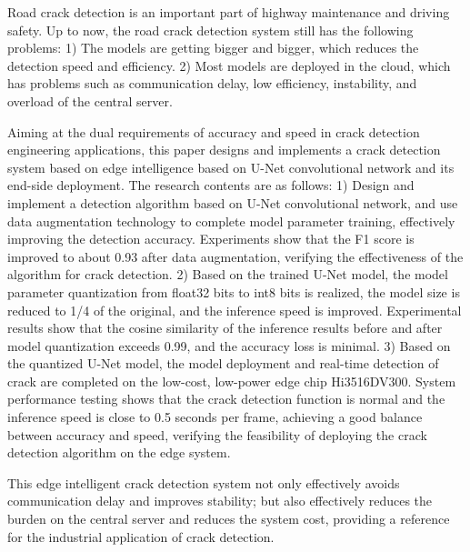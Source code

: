 
\begin{englishabstract}

Road crack detection is an important part of highway maintenance and driving safety.
Up to now, the road crack detection system still has the following problems: 
1) The models are getting bigger and bigger, which reduces the detection speed and efficiency.
2) Most models are deployed in the cloud, which has problems such as communication delay, low efficiency, instability, and overload of the central server.

Aiming at the dual requirements of accuracy and speed in crack detection engineering applications, this paper designs and implements a crack detection system based on edge intelligence based on U-Net convolutional network and its end-side deployment.
The research contents are as follows:
1) Design and implement a detection algorithm based on U-Net convolutional network, and use data augmentation technology to complete model parameter training, effectively improving the detection accuracy. 
Experiments show that the F1 score is improved to about 0.93 after data augmentation, verifying the effectiveness of the algorithm for crack detection.
2) Based on the trained U-Net model, the model parameter quantization from float32 bits to int8 bits is realized, the model size is reduced to 1/4 of the original, and the inference speed is improved. 
Experimental results show that the cosine similarity of the inference results before and after model quantization exceeds 0.99, and the accuracy loss is minimal.
3) Based on the quantized U-Net model, the model deployment and real-time detection of crack are completed on the low-cost, low-power edge chip Hi3516DV300.
System performance testing shows that the crack detection function is normal and the inference speed is close to 0.5 seconds per frame, achieving a good balance between accuracy and speed, verifying the feasibility of deploying the crack detection algorithm on the edge system.

This edge intelligent crack detection system not only effectively avoids communication delay and improves stability;
but also effectively reduces the burden on the central server and reduces the system cost, providing a reference for the industrial application of crack detection.   


\end{englishabstract}


